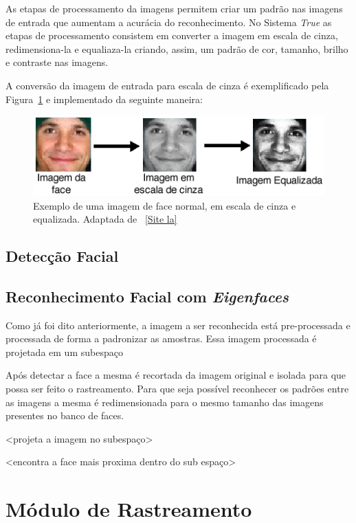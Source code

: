 		As etapas de processamento da imagens permitem criar um padrão nas imagens de entrada que aumentam a acurácia do reconhecimento. No Sistema \textit{True} as etapas de processamento consistem em converter a imagem em escala de cinza, redimensiona-la e equaliaza-la criando, assim, um padrão de cor, tamanho, brilho e contraste nas imagens.

		A conversão da imagem de entrada para escala de cinza é exemplificado pela Figura~\ref{fig:greyscale} e implementado da seguinte maneira:

		\begin{figure}[hbt]
			\begin{center}
				\includegraphics[scale=1.0]{figuras/4.ProblemaEProposta/greyscale.png}
			\end{center}
			\caption{Exemplo de uma imagem de face normal, em escala de cinza e equalizada. Adaptada de ~\ref{Site la}}
			\label{fig:greyscale}
		\end{figure}

	\subsection{Detecção Facial}
	\subsection{Reconhecimento Facial com \textit{Eigenfaces}}
	
		Como já foi dito anteriormente, a imagem a ser reconhecida está pre-processada
		e processada \cite{processamento} de forma a padronizar as amostras.
		Essa imagem processada é projetada em um subespaço
		
		Após detectar a face a mesma é recortada da imagem original e isolada para que
		possa ser feito o rastreamento. Para que seja possível reconhecer os padrões
		entre as imagens a mesma é redimensionada para o mesmo tamanho das imagens
		presentes no banco de faces.
		
		<projeta a imagem no subespaço>
		
		<encontra a face mais proxima dentro do sub espaço> 
		

\section{Módulo de Rastreamento}

